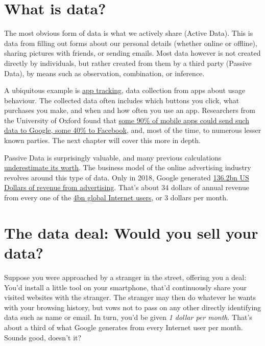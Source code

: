 \documentclass[
]{book}
\begin{document}
\hypertarget{what-is-data}{%
\section{What is data?}\label{what-is-data}}

The most obvious form of data is what we actively share (Active Data). This is data from filling out forms about our personal details (whether online or offline), sharing pictures with friends, or sending emails. Most data however is not created directly by individuals, but rather created from them by a third party (Passive Data), by means such as observation, combination, or inference.

A ubiquitous example is \href{https://en.ryte.com/wiki/App_Tracking}{app tracking}, data collection from apps about usage behaviour. The collected data often includes which buttons you click, what purchases you make, and when and how often you use an app. Researchers from the University of Oxford found that \href{https://arxiv.org/pdf/1804.03603.pdf}{some 90\% of mobile apps could send such data to Google, some 40\% to Facebook}, and, most of the time, to numerous lesser known parties. The next chapter will cover this more in depth.

Passive Data is surprisingly valuable, and many previous calculations \href{https://ig.ft.com/how-much-is-your-personal-data-worth/}{underestimate its worth}. The business model of the online advertising industry revolves around this type of data. Only in 2018, Google generated \href{https://www.statista.com/statistics/266249/advertising-revenue-of-google/}{136.2bn US Dollars of revenue from advertising}. That's about 34 dollars of annual revenue from every one of the \href{https://wearesocial.com/blog/2018/01/global-digital-report-2018}{4bn global Internet users}, or 3 dollars per month.

\hypertarget{the-data-deal-would-you-sell-your-data}{%
\section{\texorpdfstring{The data deal\textbf{: }Would you sell your data?}{The data deal: Would you sell your data?}}\label{the-data-deal-would-you-sell-your-data}}

Suppose you were approached by a stranger in the street, offering you a deal: You'd install a little tool on your smartphone, that'd continuously share your visited websites with the stranger. The stranger may then do whatever he wants with your browsing history, but vows not to pass on any other directly identifying data such as name or email. In turn, you'd be given \emph{1 dollar per month}. That's about a third of what Google generates from every Internet user per month. Sounds good, doesn't it?
\end{document}
